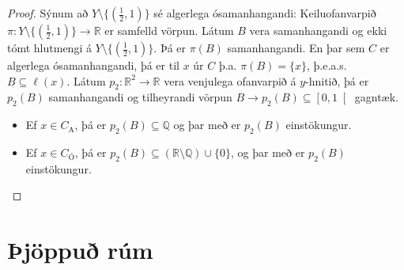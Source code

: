 \documentclass[a4paper,icelandic]{book}
\theoremstyle{definition}
\theoremstyle{plain}
\theoremstyle{remark}
\newcommand{\R}{\mathbb{R}} %
\newcommand{\Q}{\mathbb{Q}} %
\begin{document}
\begin{proof}
  Sýnum að $Y\setminus\{(\frac 12, 1)\}$ sé algerlega ósamanhangandi:
  Keiluofanvarpið $\pi: Y\setminus\{(\frac 12,1)\}\to\R$ er samfelld
  vörpun. Látum $B$ vera samanhangandi og ekki tómt hlutmengi á
  $Y\setminus\{(\frac 12,1)\}$. Þá er $\pi(B)$ samanhangandi. En þar sem $C$ er
  algerlega ósamanhangandi, þá er til $x$ úr $C$ þ.a. $\pi(B) = \{x\}$,
  þ.e.a.s. $B\subseteq \ell(x)$. Látum $p_2 : \R^2\to\R$ vera venjulega
  ofanvarpið á $y$-hnitið, þá er $p_2(B)$ samanhangandi og tilheyrandi vörpun
  $B\to p_2(B)\subseteq\left[0,1\right[$ gagntæk.
  \begin{itemize}
  \item Ef $x\in C_\text{A}$, þá er $p_2(B)\subseteq \Q$ og þar með er $p_2(B)$
    einstökungur.
  \item Ef $x\in C_\text{Ó}$, þá er $p_2(B)\subseteq(\R\setminus\Q)\cup\{0\}$,
    og þar með er $p_2(B)$ einstökungur.
  \end{itemize}
\end{proof}


\section{Þjöppuð rúm}
\label{sec:thjoppud_rum}
\end{document}
